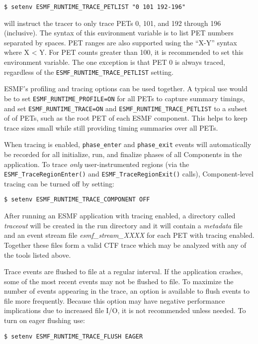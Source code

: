 \begin{verbatim}
$ setenv ESMF_RUNTIME_TRACE_PETLIST "0 101 192-196"
\end{verbatim}

will instruct the tracer to only trace PETs 0, 101, and 192 through 196
(inclusive). The syntax of this environment variable is to list
PET numbers separated by spaces. PET ranges are also supported using
the ``X-Y'' syntax where X < Y. For PET counts greater than 100, it is
recommended to set this environment variable. The one exception is that
PET 0 is always traced, regardless of the {\tt ESMF\_RUNTIME\_TRACE\_PETLIST}
setting.

ESMF's profiling and tracing options can be used together.  A typical
use would be to set {\tt ESMF\_RUNTIME\_PROFILE=ON} for all PETs to
capture summary timings, and set {\tt ESMF\_RUNTIME\_TRACE=ON} and
{\tt ESMF\_RUNTIME\_TRACE\_PETLIST} to a subset of of PETs,
such as the root PET of each ESMF component. This helps to keep trace
sizes small while still providing timing summaries over all PETs.

When tracing is enabled, {\tt phase\_enter} and {\tt phase\_exit} events will
automatically be recorded for all initialize, run, and finalize phases of all
Components in the application. To trace {\em only} user-instrumented regions (via
the {\tt ESMF\_TraceRegionEnter()} and {\tt ESMF\_TraceRegionExit()} calls),
Component-level tracing can be turned off by setting:

\begin{verbatim}
$ setenv ESMF_RUNTIME_TRACE_COMPONENT OFF
\end{verbatim}

After running an ESMF application with tracing enabled, a directory
called {\em traceout} will be created in the run directory and it will
contain a {\em metadata} file and an event stream file {\em esmf\_stream\_XXXX}
for each PET with tracing enabled. Together these files form a valid
CTF trace which may be analyzed with any of the tools listed above.

Trace events are flushed to file at a regular interval. If the application
crashes, some of the most recent events may not be flushed to file. To
maximize the number of events appearing in the trace, an option is available
to flush events to file more frequently. Because this option may have
negative performance implications due to increased file I/O, it is not
recommended unless needed. To turn on eager flushing use:

\begin{verbatim}
$ setenv ESMF_RUNTIME_TRACE_FLUSH EAGER
\end{verbatim}

